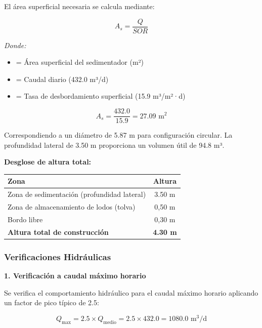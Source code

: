 \documentclass[12pt,a4paper]{article}
\begin{document}
El área superficial necesaria se calcula mediante:

\begin{equation}
A_s = \frac{Q}{SOR}
\end{equation}

\textit{Donde:}
\begin{itemize}[noitemsep,leftmargin=2em]
    \item[$A_s$] = Área superficial del sedimentador (m²)
    \item[$Q$] = Caudal diario (432.0 m³/d)
    \item[$SOR$] = Tasa de desbordamiento superficial (15.9 m³/m²·d)
\end{itemize}

\begin{equation}
A_s = \frac{432.0}{15.9} = 27.09 \text{ m}^2
\end{equation}

Correspondiendo a un diámetro de 5.87 m para configuración circular. La profundidad lateral de 3.50 m proporciona un volumen útil de 94.8 m³.

\textbf{Desglose de altura total:}

\begin{table}[H]
\centering
\small
\begin{tabular}{lc}
\toprule
Zona & Altura \\
\midrule
Zona de sedimentación (profundidad lateral) & 3.50 m \\
Zona de almacenamiento de lodos (tolva) & 0,50 m \\
Bordo libre & 0,30 m \\
\midrule
\textbf{Altura total de construcción} & \textbf{4.30 m} \\
\bottomrule
\end{tabular}
\end{table}

\subsubsection{Verificaciones Hidráulicas}

\textbf{1. Verificación a caudal máximo horario}

Se verifica el comportamiento hidráulico para el caudal máximo horario aplicando un factor de pico típico de 2.5:

\begin{equation}
Q_{\max} = 2.5 \times Q_{\text{medio}} = 2.5 \times 432.0 = 1080.0 \text{ m}^3\text{/d}
\end{equation}
\end{document}
